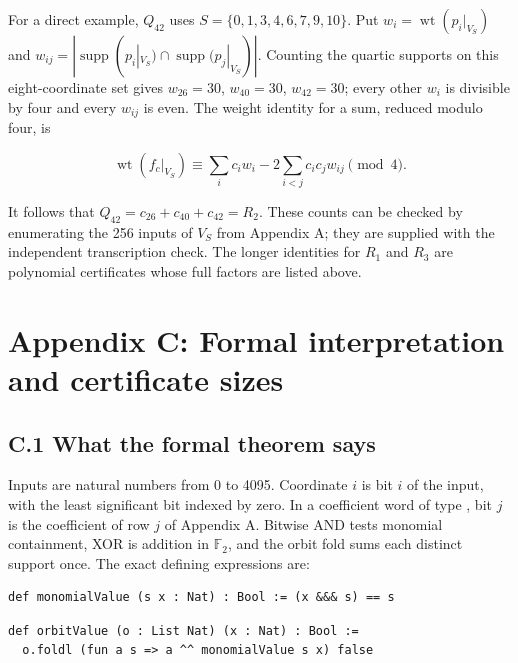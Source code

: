 \documentclass[11pt,a4paper]{article}
\begin{document}
For a direct example, $Q_{42}$ uses $S=\{0,1,3,4,6,7,9,10\}$. Put $w_i=\operatorname{wt}(p_i|_{V_S})$ and $w_{ij}=|\operatorname{supp}(p_i|_{V_S})\cap\operatorname{supp}(p_j|_{V_S})|$. Counting the quartic supports on this eight-coordinate set gives $w_{26}=30$, $w_{40}=30$, $w_{42}=30$; every other $w_i$ is divisible by four and every $w_{ij}$ is even. The weight identity for a sum, reduced modulo four, is

\[
\operatorname{wt}(f_c|_{V_S})\equiv\sum_i c_iw_i-2\sum_{i<j}c_ic_jw_{ij}\pmod4.
\]

It follows that $Q_{42}=c_{26}+c_{40}+c_{42}=R_2$. These counts can be checked by enumerating the 256 inputs of $V_S$ from Appendix A; they are supplied with the independent transcription check. The longer identities for $R_1$ and $R_3$ are polynomial certificates whose full factors are listed above.

\section*{Appendix C: Formal interpretation and certificate sizes}

\subsection*{C.1 What the formal theorem says}

Inputs are natural numbers from 0 to 4095. Coordinate $i$ is bit $i$ of the input, with the least significant bit indexed by zero. In a coefficient word of type , bit $j$ is the coefficient of row $j$ of Appendix A. Bitwise AND tests monomial containment, XOR is addition in $\mathbb F_2$, and the orbit fold sums each distinct support once. The exact defining expressions are:

\begin{Verbatim}[fontsize=\scriptsize,breaklines=true,breakanywhere=true,commandchars=\\\{\}]
def monomialValue (s x : Nat) : Bool := (x &&& s) == s
\end{Verbatim}

\begin{Verbatim}[fontsize=\scriptsize,breaklines=true,breakanywhere=true,commandchars=\\\{\}]
def orbitValue (o : List Nat) (x : Nat) : Bool :=
  o.foldl (fun a s => a ^^ monomialValue s x) false
\end{Verbatim}
\end{document}
